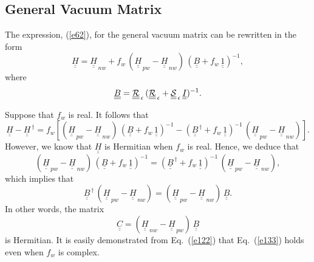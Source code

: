 \documentclass[12pt,prb,aps,notitlepage]{revtex4-1}
\begin{document}
\subsection{General Vacuum Matrix}
The expression, (\ref{e62}), for the general vacuum matrix can be rewritten in the form 
\begin{equation}\label{e130}
\underline{\underline{H}} = \underline{\underline{H}}_{\,nw} + f_w\,( \underline{\underline{H}}_{\,pw} - \underline{\underline{H}}_{\,nw} )\,(\underline{\underline{B}}+f_w\,\underline{\underline{1}})^{-1},
\end{equation}
where
\begin{equation}\label{e77y}
\underline{\underline{B}}= \underline{\underline{\cal R}}_{\,\epsilon}\,(\underline{\underline{\cal R}}_{\,\epsilon} + \underline{\underline{\cal S}}_{\,\epsilon}\,\underline{\underline{I}})^{-1}.
\end{equation}

Suppose that $f_w$ is real. It follows that
\begin{equation}
\underline{\underline{H}} -\underline{\underline{H}}^{\,\dag} = 
f_w\left[( \underline{\underline{H}}_{\,pw} - \underline{\underline{H}}_{\,nw} )\,(\underline{\underline{B}}+f_w\,\underline{\underline{1}})^{-1}- (\underline{\underline{B}}^{\,\dag}+f_w\,
\underline{\underline{1}})^{-1}\,( \underline{\underline{H}}_{\,pw} - \underline{\underline{H}}_{\,nw} )
\right].
\end{equation}
However, we know that $\underline{\underline{H}}$ is Hermitian when $f_w$ is real. Hence, we deduce that
\begin{equation}\label{e133}
 (\underline{\underline{H}}_{\,pw} - \underline{\underline{H}}_{\,nw} )\,(\underline{\underline{B}}+f_w\,\underline{\underline{1}})^{-1}= (\underline{\underline{B}}^{\,\dag}+f_w\,
\underline{\underline{1}})^{-1}\,( \underline{\underline{H}}_{\,pw} - \underline{\underline{H}}_{\,nw} ),
\end{equation}
which implies that
\begin{equation}\label{e122}
\underline{\underline{B}}^{\,\dag}\,( \underline{\underline{H}}_{\,pw} - \underline{\underline{H}}_{\,nw} )= ( \underline{\underline{H}}_{\,pw} - \underline{\underline{H}}_{\,nw} )\,\underline{\underline{B}}.
\end{equation}
In other words, the matrix
\begin{equation}\label{cdef}
\underline{\underline{C}} = ( \underline{\underline{H}}_{\,nw} - \underline{\underline{H}}_{\,pw} )\,\underline{\underline{B}}
\end{equation}
is Hermitian.
It is easily demonstrated from Eq.~(\ref{e122}) that Eq.~(\ref{e133}) holds even when $f_w$ is complex. 
\end{document}
